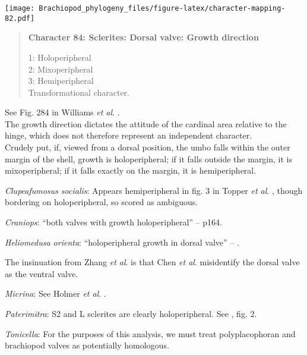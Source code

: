 \documentclass[openany]{book}
\theoremstyle{definition}
\theoremstyle{definition}
\theoremstyle{definition}
\theoremstyle{remark}
\begin{document}
\texttt{[image: Brachiopod\_phylogeny\_files/figure-latex/character-mapping-82.pdf]}

\begin{quote}
\textbf{Character 84: Sclerites: Dorsal valve: Growth direction}

1: Holoperipheral\\
2: Mixoperipheral\\
3: Hemiperipheral\\
Transformational character.
\end{quote}

See Fig. 284 in Williams \emph{et al}.
\citeyearpar{Williams1997Introduction}.\\
The growth direction dictates the attitude of the cardinal area relative
to the hinge, which does not therefore represent an independent
character.\\
Crudely put, if, viewed from a dorsal position, the umbo falls within
the outer margin of the shell, growth is holoperipheral; if it falls
outside the margin, it is mixoperipheral; if it falls exactly on the
margin, it is hemiperipheral.

\hypertarget{Clupeafumosus_socialis-coding-84}{}
\emph{Clupeafumosus socialis}: Appears hemiperipheral in fig. 3 in
Topper \emph{et al}. \citeyearpar{Topper2013Reappraisalof}, though
bordering on holoperipheral, so scored as ambiguous.

\hypertarget{Craniops-coding-84}{}
\emph{Craniops}: ``both valves with growth holoperipheral'' --
\citet{Williams2000LinguliformeaCraniiformea} p164.

\hypertarget{Heliomedusa_orienta-coding-84}{}
\emph{Heliomedusa orienta}: ``holoperipheral growth in dorsal valve'' --
\citet{Williams2007Supplement}.

The insinuation from Zhang \emph{et al}.
\citeyearpar{Zhang2009Architectureand} is that Chen \emph{et al}.
\citeyearpar{Chen2007Reinterpretationof} misidentify the dorsal valve as
the ventral valve.

\hypertarget{Micrina-coding-84}{}
\emph{Micrina}: See Holmer \emph{et al}.
\citeyearpar{Holmer2008TheEarly}.

\hypertarget{Paterimitra-coding-84}{}
\emph{Paterimitra}: S2 and L sclerites are clearly holoperipheral. See
\citet{Larsson2014iPaterimitra}, fig. 2.

\hypertarget{Tonicella-coding-84}{}
\emph{Tonicella}: For the purposes of this analysis, we must treat
polyplacophoran and brachiopod valves as potentially homologous.
\end{document}
